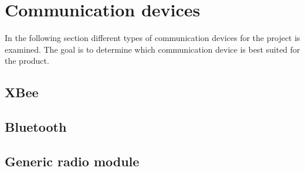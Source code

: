 \section{Communication devices}
In the following section different types of communication devices for the project is examined. The goal is to determine which communication device is best suited for the product.

\subsection{XBee}


\subsection{Bluetooth}


\subsection{Generic radio module}